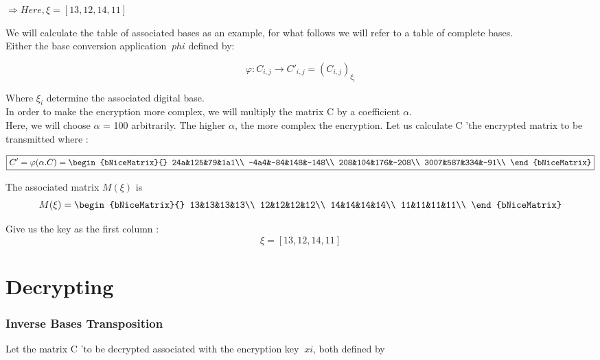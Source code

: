 \documentclass{article}
\begin{document}
$\Longrightarrow Here, \xi = [13,12,14,11] $
\newline
\\
\begin{flushleft}

We will calculate the table of associated bases as an example, for what follows we will refer to a table of complete bases.\\
Either the base conversion application $ \ phi $ defined by:
\end{flushleft}
$$
\boxed{
	\varphi : C_{i,j} \longrightarrow C'_{i,j} = (C_{i,j})_{\xi_{i}}
}$$
\begin{flushleft}
Where $\xi_{i}$ determine the associated digital base.\\
In order to make the encryption more complex, we will multiply the matrix C by a coefficient $ \alpha $.
\newline
\\
Here, we will choose $ \alpha $ = 100 arbitrarily.
The higher $ \alpha $, the more complex the encryption.
Let us calculate C 'the encrypted matrix to be transmitted where : 
\end{flushleft}
$$
\boxed{
C'=\varphi (\alpha . C) =
\begin{bNiceMatrix}{}
24a&125&79&1a1\\
-4a4&-84&148&-148\\
208&104&176&-208\\
3007&587&334&-91\\
\end{bNiceMatrix}\\
}$$

The associated matrix $M(\xi)$ is
$$
M(\xi) =
\begin{bNiceMatrix}{}
13&13&13&13\\
12&12&12&12\\
14&14&14&14\\
11&11&11&11\\
\end{bNiceMatrix}
$$

Give us the key as the first column : 
$$
\boxed{
	\xi = [13,12,14,11] 
}$$
\newpage
\part{Decrypting}
\section*{Inverse Bases Transposition}
Let the matrix C 'to be decrypted associated with the encryption key $ \ xi $, both defined by
\end{document}
